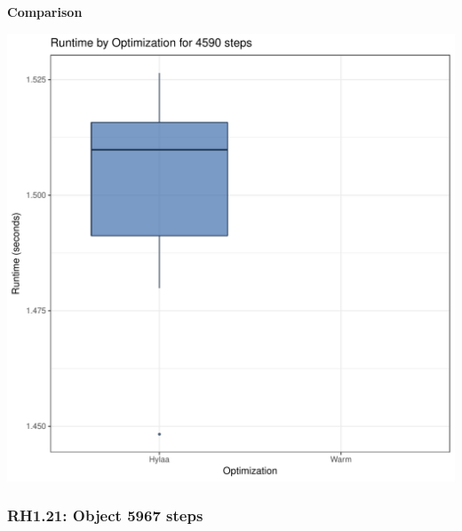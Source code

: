 \documentclass{article}\usepackage[]{graphicx}\usepackage[]{color}
\makeatletter
\def\maxwidth{ %
  \ifdim\Gin@nat@width>\linewidth
    \linewidth
  \else
    \Gin@nat@width
  \fi
}
\newenvironment{knitrout}{}{} %
\makeatother
\begin{document}
 \textbf{Comparison}
  
\begin{knitrout}
\color{fgcolor}
\includegraphics[width=\maxwidth]{figure/RH1_steps4590-1} 

\end{knitrout}


\subsubsection{RH1.21: Object 5967 steps}
\end{document}
